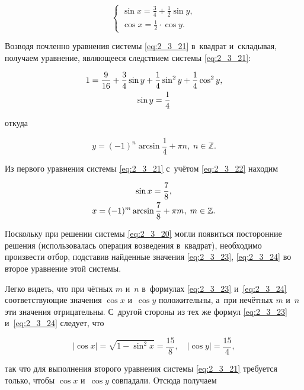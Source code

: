 \begin{equation}\label{eq:2_3_21}
\begin{cases}
\displaystyle \sin x = \frac{3}{4} + \frac{1}{2} \sin y, \\[10pt]
\displaystyle \cos x = \frac{1}{2} \cdot \cos y.
\end{cases}
\end{equation}

Возводя почленно уравнения системы \eqref{eq:2_3_21} в~квадрат
и~складывая, получаем уравнение, являющееся следствием системы \eqref{eq:2_3_21}:

\begin{gather}
\displaystyle 1 = \frac{9}{16} + \frac{3}{4} \sin y +
\frac{1}{4} \sin^{2} y + \frac{1}{4} \cos^{2} y, \notag \\
\displaystyle \sin y = \frac{1}{4} \label{eq:2_3_22}
\end{gather}

\noindent
откуда

\begin{equation}\label{eq:2_3_23}
y = (-1)^{n} \arcsin \frac{1}{4} + \pi n, \; n \in \mathbb{Z}.
\end{equation}

Из первого уравнения системы \eqref{eq:2_3_21} с~учётом \eqref{eq:2_3_22}
находим 

\begin{gather}
\displaystyle \sin x = \frac{7}{8}, \notag \\
x = (-1)^{m} \arcsin \frac{7}{8} + \pi m, \; m \in \mathbb{Z}.\label{eq:2_3_24}
\end{gather}

Поскольку при решении системы \eqref{eq:2_3_20} могли появиться посторонние решения
(использовалась операция возведения в~квадрат), необходимо произвести отбор,
подставив найденные значения \eqref{eq:2_3_23}, \eqref{eq:2_3_24} во второе
уравнение этой системы.

Легко видеть, что при чётных $m$ и~$n$ в~формулах \eqref{eq:2_3_23}
и~\eqref{eq:2_3_24} соответствующие значения $\cos x$ и~$\cos y$ положительны,
а~при нечётных $m$ и~$n$ эти значения отрицательны.
С~другой стороны из тех же формул \eqref{eq:2_3_23} и~\eqref{eq:2_3_24} следует,
что

\begin{equation*}
\displaystyle |\cos x| = \sqrt{1 - \sin^{2} x} = \frac{15}{8}, \quad
\displaystyle |\cos y| = \frac{15}{4},
\end{equation*}

\noindent
так что для выполнения второго уравнения системы \eqref{eq:2_3_21} требуется
только, чтобы $\cos x$ и~$\cos y$ совпадали. Отсюда получаем

